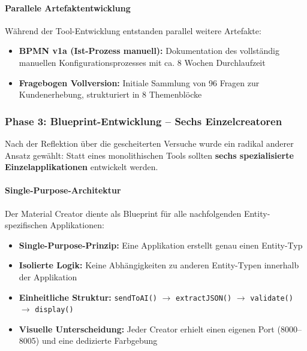 \paragraph{Parallele Artefaktentwicklung}

Während der Tool-Entwicklung entstanden parallel weitere Artefakte:

\begin{itemize}
    \item \textbf{BPMN v1a (Ist-Prozess manuell):} Dokumentation des vollständig manuellen Konfigurationsprozesses mit ca. 8 Wochen Durchlaufzeit
    \item \textbf{Fragebogen Vollversion:} Initiale Sammlung von 96 Fragen zur Kundenerhebung, strukturiert in 8 Themenblöcke
\end{itemize}


\subsubsection{Phase 3: Blueprint-Entwicklung -- Sechs Einzelcreatoren}
\label{subsubsec:Phase3}

Nach der Reflektion über die gescheiterten Versuche wurde ein radikal anderer Ansatz gewählt: Statt eines monolithischen Tools sollten \textbf{sechs spezialisierte Einzelapplikationen} entwickelt werden.

\paragraph{Single-Purpose-Architektur}

Der Material Creator diente als Blueprint für alle nachfolgenden Entity-spezifischen Applikationen:

\begin{itemize}
    \item \textbf{Single-Purpose-Prinzip:} Eine Applikation erstellt genau einen Entity-Typ
    \item \textbf{Isolierte Logik:} Keine Abhängigkeiten zu anderen Entity-Typen innerhalb der Applikation
    \item \textbf{Einheitliche Struktur:} \texttt{sendToAI()} $\rightarrow$ \texttt{extractJSON()} $\rightarrow$ \texttt{validate()} $\rightarrow$ \texttt{display()}
    \item \textbf{Visuelle Unterscheidung:} Jeder Creator erhielt einen eigenen Port (8000--8005) und eine dedizierte Farbgebung
\end{itemize}

